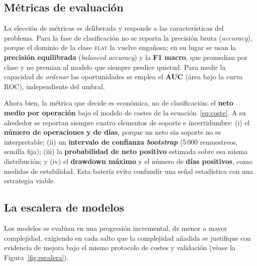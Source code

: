\subsection{Métricas de evaluación}
\label{sec::metricas}

La elección de métricas es deliberada y responde a las características del problema. Para la
fase de clasificación no se reporta la precisión bruta (\emph{accuracy}), porque el dominio
de la clase \textsc{flat} la vuelve engañosa; en su lugar se usan la \textbf{precisión
equilibrada} (\emph{balanced accuracy}) y la \textbf{F1 macro}, que promedian por clase y no
premian al modelo que siempre predice quietud. Para medir la capacidad de \emph{ordenar} las
oportunidades se emplea el \textbf{AUC} (área bajo la curva ROC), independiente del umbral.

Ahora bien, la métrica que decide es económica, no de clasificación: el \textbf{neto medio
por operación} bajo el modelo de costes de la ecuación~\eqref{eq:coste}. A su alrededor se
reportan siempre cuatro elementos de soporte e incertidumbre: (i) el \textbf{número de
operaciones y de días}, porque un neto sin soporte no es interpretable; (ii) un
\textbf{intervalo de confianza \emph{bootstrap}} (5\,000 remuestreos, semilla fija); (iii) la
\textbf{probabilidad de neto positivo} estimada sobre esa misma distribución; y (iv) el
\textbf{drawdown máximo} y el número de \textbf{días positivos}, como medidas de estabilidad.
Esta batería evita confundir una señal estadística con una estrategia viable.

\subsection{La escalera de modelos}
\label{sec::escalera_modelos}

Los modelos se evalúan en una progresión incremental, de menor a mayor complejidad,
exigiendo en cada salto que la complejidad añadida se justifique con evidencia de mejora
bajo el mismo protocolo de costes y validación (véase la Figura~\ref{fig:escalera}).

